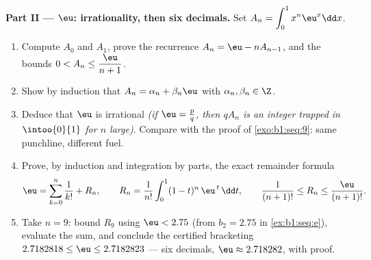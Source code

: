 \begin{problem}
\medskip
\noindent\textbf{Part II --- $\eu$: irrationality, then six
decimals.} Set $A_n = \displaystyle\int_0^1 x^n \eu^x \dd x$.
\begin{enumerate}[resume]
  \item Compute $A_0$ and $A_1$, prove the recurrence $A_n = \eu
        - n A_{n-1}$, and the bounds $0 < A_n \leq
        \dfrac{\eu}{n+1}$.
  \item Show by induction that $A_n = \alpha_n + \beta_n \eu$
        with $\alpha_n, \beta_n \in \Z$.
  \item Deduce that $\eu$ is irrational \emph{(if $\eu = \frac
        pq$, then $q A_n$ is an integer trapped in
        $\intoo{0}{1}$ for $n$ large)}. Compare with the proof
        of \cref{exo:b1:seq:9}: same punchline, different fuel.
  \item Prove, by induction and integration by parts, the exact
        remainder formula
        \[
        \eu = \sum_{k=0}^{n} \frac{1}{k!} + R_n,
        \qquad
        R_n = \frac{1}{n!}\int_0^1 (1 - t)^n\,\eu^{\,t}\,\dd t,
        \qquad
        \frac{1}{(n+1)!} \leq R_n \leq \frac{\eu}{(n+1)!} .
        \]
  \item Take $n = 9$: bound $R_9$ using $\eu < 2.75$ (from
        $b_2 = 2.75$ in \cref{ex:b1:seq:e}), evaluate the sum,
        and conclude the certified bracketing $2.7182818 \leq
        \eu \leq 2.7182823$ --- six decimals, $\eu \approx
        2.718282$, with proof.
\end{enumerate}


\end{problem}
